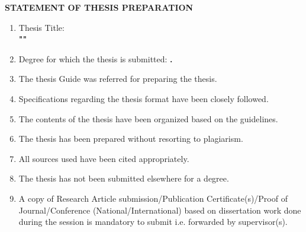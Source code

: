 \vspace{4ex}
\addchaptertocentry{\certificatename}

\begin{center}
    \textbf {\Large{STATEMENT OF THESIS PREPARATION}}
\end{center}



\begin{enumerate}
\item Thesis Title:\\
\textbf{"\ReportTitel"}
\item Degree for which the thesis is submitted: \textbf{ \fACourse .}
\item The thesis Guide was referred for preparing the thesis. 
\item Specifications regarding the thesis format have been closely followed. 
\item The contents of the thesis have been organized based on the guidelines. 
\item The thesis has been prepared without resorting to plagiarism. 
\item All sources used have been cited appropriately. 
\item The thesis has not been submitted elsewhere for a degree. 
\item A copy of Research Article submission/Publication Certificate(s)/Proof of Journal/Conference (National/International) based on dissertation work done during the session is mandatory to submit i.e. forwarded by supervisor(s). 


\end{enumerate}






\vspace*{2cm}

